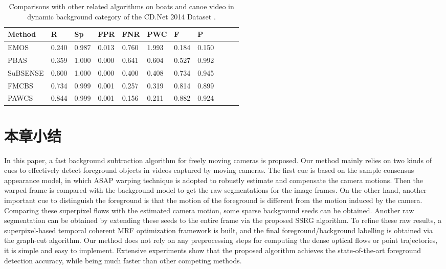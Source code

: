  \begin{table}[ht]
\caption{Comparisons with other related algorithms on boats and canoe video in dynamic background category of the CD.Net 2014 Dataset \cite{CD2014}.}
\label{tab:Comparisons on Dynamic backgrounds }
\begin{center}
\begin{tabular}{|l|l|l|l|l|l|l|l|l|l|l|} %
\hline
\rule[-1ex]{0pt}{3.5ex}  Method &R &Sp & FPR & FNR &PWC &F &P\\
\hline
\rule[-1ex]{0pt}{3.5ex}  EMOS\cite{Chien2002Efficient}&  0.240&0.987&0.013&0.760&1.993&0.184&0.150 \\
\hline
\rule[-1ex]{0pt}{3.5ex}  PBAS\cite{pbas}&0.359&1.000&0.000&0.641&0.604&0.527&0.992  \\
\hline
\rule[-1ex]{0pt}{3.5ex}  SuBSENSE\cite{subsenseTIP}&  0.600&1.000&0.000&0.400&0.408&0.734&0.945 \\
\hline
\rule[-1ex]{0pt}{3.5ex}  FMCBS &  0.734 & 0.999 & 0.001 & 0.257 &0.319&0.814&0.899\\
\hline
\rule[-1ex]{0pt}{3.5ex}  PAWCS\cite{Stcharles2015A}&0.844&0.999&0.001&0.156&0.211&0.882&0.924\\
\hline
\end{tabular}
\end{center}
\end{table}
 \section{本章小结}
 \label{ch4:sec:conclusions}
 In this paper, a fast background subtraction algorithm for freely moving cameras is proposed. Our method mainly relies on two kinds of cues to effectively detect foreground objects in videos captured by moving cameras. The first cue is based on the sample consensus appearance model, in which ASAP warping technique is adopted to robustly estimate and compensate the camera motions. Then the warped frame is compared with the background model to get the raw segmentations for the image frames. On the other hand, another important cue to distinguish the foreground is that the motion of the foreground is different from the motion induced by the camera. Comparing these superpixel flows with the estimated camera motion, some sparse background seeds can be obtained. Another raw segmentation can be obtained by extending these seeds to the entire frame via the proposed SSRG algorithm.  To refine these raw results, a superpixel-based  temporal coherent MRF optimization framework is built, and the final foreground/background labelling is obtained via the graph-cut algorithm. Our method does not rely on any preprocessing steps for computing the dense optical flows or point trajectories, it is simple and easy to implement. Extensive experiments show that the proposed algorithm achieves the state-of-the-art foreground detection accuracy, while being much faster than other competing methods.
